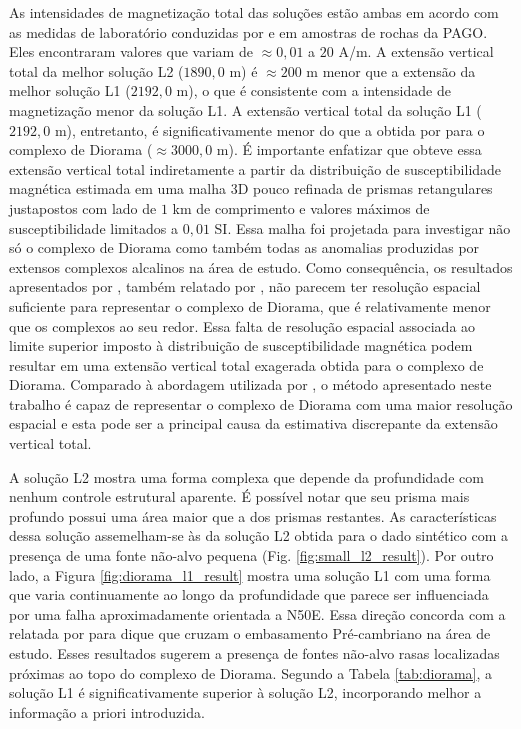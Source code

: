 As intensidades de magnetização total das soluções estão ambas em acordo com as medidas de laboratório conduzidas por \citet{dutra2011} e \citet{dutra_etal2014} 
em amostras de rochas da PAGO. Eles encontraram valores que variam de $\approx 0,01$ a $20$ A/m.
A extensão vertical total da melhor solução L2 ($1890,0$ m) é $\approx 200$ m 
menor que a extensão da melhor solução L1 ($2192,0$ m), o que é consistente com a intensidade de magnetização menor da solução L1.
A extensão vertical total da solução L1 ($2192,0$ m), entretanto, é significativamente menor do que a obtida por \citet[][Fig. 4.9, p. 78]{dutra2011} para o complexo de Diorama ($\approx 3000,0$ m). 
É importante enfatizar que \cite{dutra2011} obteve essa extensão vertical total indiretamente a partir da distribuição de susceptibilidade magnética estimada em uma malha 3D pouco refinada de prismas retangulares justapostos com lado de $1$ km de comprimento e valores máximos de susceptibilidade limitados a $0,01$ SI.
Essa malha foi projetada para investigar não só o complexo de Diorama como também todas as anomalias produzidas por extensos complexos alcalinos na área de estudo. Como consequência, os resultados apresentados por
\citet{dutra2011}, também relatado por \citet{marangoni_mantovani2013}, não parecem ter resolução espacial suficiente para representar o complexo de Diorama, que é relativamente menor que os complexos ao seu redor.
Essa falta de resolução espacial associada ao limite superior imposto à distribuição de susceptibilidade magnética podem resultar em uma extensão vertical total exagerada obtida para o complexo de Diorama.
Comparado à abordagem utilizada por \citet{dutra2011}, o método apresentado neste trabalho é capaz de representar o complexo de Diorama com uma maior resolução espacial e esta pode ser a principal causa da estimativa discrepante da extensão vertical total.

A solução L2 mostra uma forma complexa que depende da profundidade com nenhum controle estrutural aparente. É possível notar que seu prisma mais profundo possui uma área maior que a dos prismas restantes. As características dessa solução assemelham-se às da solução L2 obtida para o dado sintético com a presença de uma fonte não-alvo pequena (Fig. \ref{fig:small_l2_result}).
Por outro lado, a Figura \ref{fig:diorama_l1_result} mostra uma solução L1 com uma forma que varia continuamente ao longo da profundidade que parece ser influenciada por uma falha aproximadamente orientada a N50E. Essa direção concorda com a relatada por
\citet{junqueirabrod_etal2002} para dique que cruzam o embasamento Pré-cambriano na área de estudo.
Esses resultados sugerem a presença de fontes não-alvo rasas localizadas próximas ao topo do complexo de Diorama.
Segundo a Tabela \ref{tab:diorama}, a solução L1 é significativamente superior à solução L2, incorporando melhor a informação a priori introduzida.

